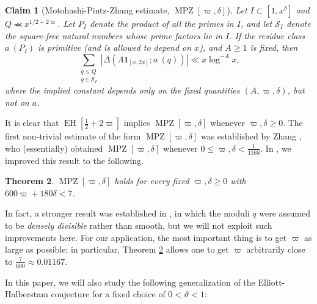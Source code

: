 \documentclass{bmcart}
\DeclareMathOperator*\EH{EH}
\DeclareMathOperator*\MPZ{MPZ}
\theoremstyle{plain}
\newtheorem{theorem}{Theorem}[section]
\newtheorem{claim}[theorem]{Claim}
\theoremstyle{definition}
\newcommand\Scal{\mathcal{S}}
\renewcommand{\lessapprox}{\llcurly}
\newcommand{\onef}{\mathbf{1}}
\begin{document}
\begin{claim}[Motohashi-Pintz-Zhang estimate,
  {$\MPZ[\varpi,\delta]$}]\label{mpz-claim} Let $I \subset
  [1,x^\delta]$ and $Q \lessapprox x^{1/2+2\varpi}$.  Let $P_I$ denote the product of all the primes in $I$, and let $\Scal_I$ denote the square-free natural numbers whose prime factors lie in $I$.  If the residue class $a\ (P_I)$ is
  primitive (and is allowed to depend on $x$), and $A \geq 1$
  is fixed, then
\begin{equation}\label{qq-mpz}
  \sum_{\substack{q \leq Q\\q \in \Scal_I}} |\Delta(\Lambda \onef_{[x,2x]}; a\ (q))| \ll x \log^{-A} x,
\end{equation}
where the implied constant depends only on the fixed quantities $(A,\varpi,\delta)$, but
not on $a$.
\end{claim}

It is clear that $\EH[\frac{1}{2}+2\varpi]$ implies $\MPZ[\varpi,\delta]$ whenever $\varpi,\delta \geq 0$.  The first non-trivial estimate of the form $\MPZ[\varpi,\delta]$ was established by Zhang \cite{zhang}, who (essentially) obtained $\MPZ[\varpi,\delta]$ whenever $0 \leq \varpi, \delta < \frac{1}{1168}$.
In \cite[Theorem 2.17]{polymath8a}, we improved this result to the following.

\begin{theorem}\label{mpz-poly}  $\MPZ[\varpi,\delta]$ holds for every fixed $\varpi,\delta \geq 0$ with $600 \varpi + 180 \delta < 7$.
\end{theorem}

In fact, a stronger result was established in \cite{polymath8a}, in which the moduli $q$ were assumed to be \emph{densely divisible} rather than smooth, but we will not exploit such improvements here.  For our application, the most important thing is to get $\varpi$ as large as possible; in particular, Theorem \ref{mpz-poly} allows one to get $\varpi$ arbitrarily close to $\frac{7}{600} \approx 0.01167$. 

%
%

In this paper, we will also study the following generalization of the Elliott-Halberstam conjecture for a fixed choice of $0 < \vartheta < 1$:
\end{document}
